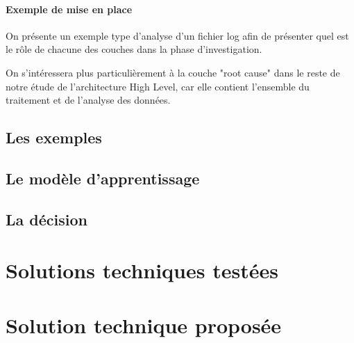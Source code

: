 \paragraph{Exemple de mise en place } On présente un exemple type d'analyse d'un fichier log afin de présenter quel est le rôle de chacune des couches dans la phase d'investigation.

On s'intéressera plus particulièrement à la couche "root cause" dans le reste de notre étude de l'architecture High Level, car elle contient l'ensemble du traitement et de l'analyse des données.

\subsection{Les exemples}
\label{Automatisation du processus d'investigation: Achitecture High Level du système proposé: Les exemples}

\subsection{Le modèle d'apprentissage}
\label{Automatisation du processus d'investigation: Achitecture High Level du système proposé: Le modèle d'apprentissage}

\subsection{La décision}
\label{Automatisation du processus d'investigation: Achitecture High Level du système proposé: La décision}



\section{Solutions techniques testées}
\label{Automatisation du processus d'investigation: Solutions techniques testées}




\section{Solution technique proposée}
\label{Automatisation du processus d'investigation: Solution technique proposée}


